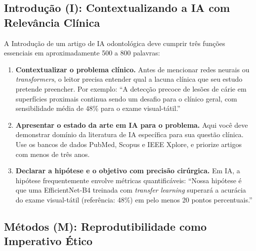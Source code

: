 \subsection{Introdução (I): Contextualizando a IA com Relevância Clínica}

A Introdução de um artigo de IA odontológica deve cumprir três funções
essenciais em aproximadamente 500 a 800 palavras:

\begin{enumerate}
  \item \textbf{Contextualizar o problema clínico.} Antes de mencionar redes
    neurais ou \textit{transformers}, o leitor precisa entender qual a lacuna
    clínica que seu estudo pretende preencher. Por exemplo: ``A detecção precoce
    de lesões de cárie em superfícies proximais continua sendo um desafio para o
    clínico geral, com sensibilidade média de 48\% para o exame visual-tátil.''

  \item \textbf{Apresentar o estado da arte em IA para o problema.} Aqui você
    deve demonstrar domínio da literatura de IA específica para sua questão
    clínica. Use os bancos de dados PubMed, Scopus e IEEE Xplore, e priorize
    artigos com menos de três anos.

  \item \textbf{Declarar a hipótese e o objetivo com precisão cirúrgica.} Em IA,
    a hipótese frequentemente envolve métricas quantificáveis: ``Nossa hipótese é
    que uma EfficientNet-B4 treinada com \textit{transfer learning} superará a
    acurácia do exame visual-tátil (referência: 48\%) em pelo menos 20 pontos
    percentuais.''
\end{enumerate}



\subsection{Métodos (M): Reprodutibilidade como Imperativo Ético}

